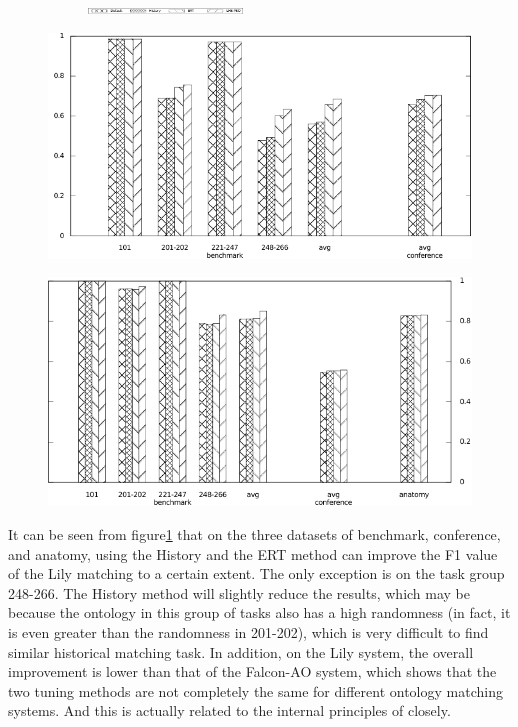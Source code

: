 \documentclass[twoside]{article}
\begin{document}
\begin{figure}[htb!]\centering
\begin{subfigure}{\textwidth}
	\centering
	\includegraphics[width=0.45\textwidth]{figures/legend.pdf}
\end{subfigure}
\begin{minipage}{0.49\textwidth}
	\centering
	\includegraphics[width=\textwidth]{data_figs/GMap_F1-Measure.pdf}
	\label{fig:GMap_F1-Measure}
\end{minipage}
\begin{minipage}{0.49\textwidth}
	\centering
	\includegraphics[width=\textwidth]{data_figs/Lily_F1-Measure.pdf}
	\label{fig:Lily_F1-Measure}
\end{minipage}
\end{figure}


It can be seen from figure\ref{fig:Lily_F1-Measure} that on the three datasets of benchmark, conference, and anatomy, using the History and the ERT method can improve the F1 value of the Lily matching to a certain extent. The only exception is on the task group 248-266. The History method will slightly reduce the results, which may be because the ontology in this group of tasks also has a high randomness (in fact, it is even greater than the randomness in 201-202), which is very difficult to find similar historical matching task.
In addition, on the Lily system, the overall improvement is lower than that of the Falcon-AO system, which shows that the two tuning methods are not completely the same for different ontology matching systems. And this is actually related to the internal principles of closely.
\end{document}
